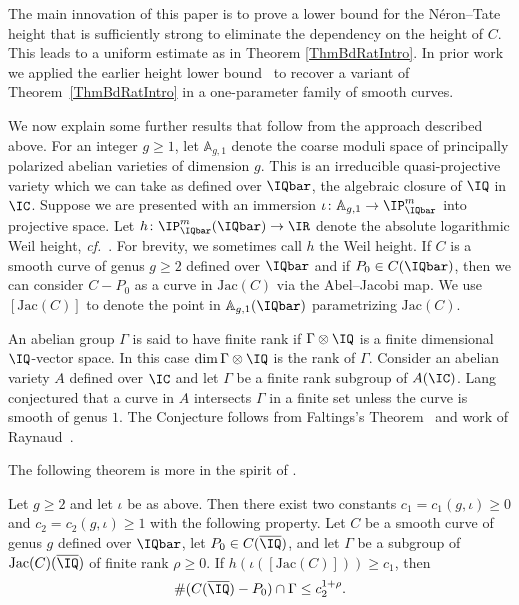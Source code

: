 The main innovation of this paper is to prove a lower bound for the
N\'eron--Tate height that is sufficiently strong to eliminate the
dependency on the height of $C$. This leads to a uniform estimate as
in Theorem \ref{ThmBdRatIntro}. In prior work~\cite{DGH1p} we
applied the earlier height lower bound~\cite{GaoHab}
to recover a variant of Theorem~\ref{ThmBdRatIntro} in
a one-parameter family of smooth curves.

We now explain some further  results that follow from the approach
described above.
For an integer $g\ge 1$, let $\mathbb{A}_{g,1}$ denote the coarse moduli
space of principally polarized abelian varieties of dimension $g$.
This is an irreducible quasi-projective variety which we can take as
defined over $\IQbar$, the algebraic closure of $\IQ$ in $\IC$.
Suppose we are presented with an immersion
$\iota\colon \mathbb{A}_{g,1}\rightarrow \IP^m_\IQbar$ into projective
space.
Let $h\colon \IP^m_\IQbar(\IQbar)\rightarrow\IR$ denote the absolute
logarithmic Weil height,
\textit{cf.}~\cite[$\mathsection$1.5.1]{BG}.
For brevity, we sometimes call $h$ the Weil height.
If $C$ is a smooth curve of genus $g\ge 2$ defined over $\IQbar$ and if
$P_0\in C(\IQbar)$, then we can consider $C-P_0$ as a curve in
$\mathrm{Jac}(C)$ via the Abel--Jacobi map.
We use $[\mathrm{Jac}(C)]$ to denote the point in $ \mathbb{A}_{g,1}(\IQbar)$  parametrizing $\mathrm{Jac}(C)$.

An abelian group $\Gamma$ is said to have finite rank if
$\Gamma\otimes\IQ$ is a finite dimensional $\IQ$-vector space. In this
case $\dim\Gamma\otimes\IQ$ is the rank of $\Gamma$.
Consider an abelian variety $A$ defined over $\IC$ and let $\Gamma$ be
a finite rank subgroup of $A(\IC)$. Lang~\cite{Lang:Division}
conjectured that a
curve in $A$ intersects $\Gamma$ in a finite set
unless the curve is smooth of genus $1$. The Conjecture follows from
Faltings's Theorem~\cite{Faltings:ES} and work of
Raynaud~\cite{Raynaud:MMcurves}.

The following theorem is more in the spirit of \cite[top of page
234]{mazur1986arithmetic}.

\begin{theorem}
\notready
\label{ThmBdFinRank}
Let $g \ge 2$ and let $\iota$ be as above. Then there exist two
constants $c_1= c_1(g,\iota) \ge 0$ and $c_2 = c_2(g,\iota) \ge 1$ with the following property. Let $C$
be a  smooth curve of genus $g$  defined over $\IQbar$,
let $P_0 \in C(\overline \IQ)$, and let $\Gamma$ be a
subgroup of $\mathrm{Jac}(C)(\overline \IQ)$ of finite rank $\rho\ge
0$. If $h(\iota([\mathrm{Jac}(C)])) \ge c_1$, then
\[
\#(C(\overline \IQ)-P_0) \cap \Gamma  \le c_2^{1+\rho}.
\]
\end{theorem}

